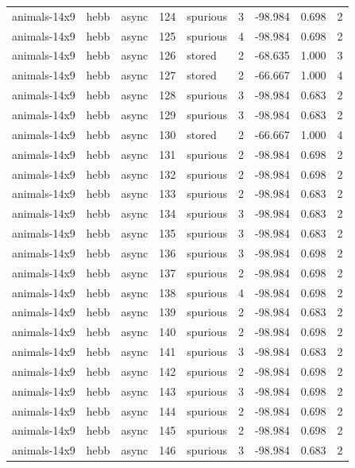\begin{tabular}{lllrlrrrr}
animals-14x9 & hebb & async & 124 & spurious & 3 & -98.984 & 0.698 & 2 \\
animals-14x9 & hebb & async & 125 & spurious & 4 & -98.984 & 0.698 & 2 \\
animals-14x9 & hebb & async & 126 & stored & 2 & -68.635 & 1.000 & 3 \\
animals-14x9 & hebb & async & 127 & stored & 2 & -66.667 & 1.000 & 4 \\
animals-14x9 & hebb & async & 128 & spurious & 3 & -98.984 & 0.683 & 2 \\
animals-14x9 & hebb & async & 129 & spurious & 3 & -98.984 & 0.683 & 2 \\
animals-14x9 & hebb & async & 130 & stored & 2 & -66.667 & 1.000 & 4 \\
animals-14x9 & hebb & async & 131 & spurious & 2 & -98.984 & 0.698 & 2 \\
animals-14x9 & hebb & async & 132 & spurious & 2 & -98.984 & 0.698 & 2 \\
animals-14x9 & hebb & async & 133 & spurious & 2 & -98.984 & 0.683 & 2 \\
animals-14x9 & hebb & async & 134 & spurious & 3 & -98.984 & 0.683 & 2 \\
animals-14x9 & hebb & async & 135 & spurious & 3 & -98.984 & 0.683 & 2 \\
animals-14x9 & hebb & async & 136 & spurious & 3 & -98.984 & 0.698 & 2 \\
animals-14x9 & hebb & async & 137 & spurious & 2 & -98.984 & 0.698 & 2 \\
animals-14x9 & hebb & async & 138 & spurious & 4 & -98.984 & 0.698 & 2 \\
animals-14x9 & hebb & async & 139 & spurious & 2 & -98.984 & 0.683 & 2 \\
animals-14x9 & hebb & async & 140 & spurious & 2 & -98.984 & 0.698 & 2 \\
animals-14x9 & hebb & async & 141 & spurious & 3 & -98.984 & 0.683 & 2 \\
animals-14x9 & hebb & async & 142 & spurious & 2 & -98.984 & 0.698 & 2 \\
animals-14x9 & hebb & async & 143 & spurious & 3 & -98.984 & 0.698 & 2 \\
animals-14x9 & hebb & async & 144 & spurious & 2 & -98.984 & 0.698 & 2 \\
animals-14x9 & hebb & async & 145 & spurious & 2 & -98.984 & 0.698 & 2 \\
animals-14x9 & hebb & async & 146 & spurious & 3 & -98.984 & 0.683 & 2 \\

\end{tabular}
